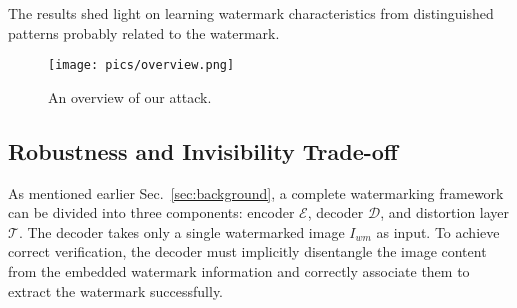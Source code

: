 The results shed light on learning watermark characteristics from distinguished patterns probably related to the watermark.

\begin{figure}[!t]
    \centering
    \texttt{[image: pics/overview.png]} 
    
    \caption{An overview of our attack.} 
    \label{fig:method-overview}
    \vspace{-3mm}
\end{figure}

\subsection{Robustness and Invisibility Trade-off}\label{sec:Method_Theory}
As mentioned earlier Sec.~\ref{sec:background}, a complete watermarking framework can be divided into three components: encoder $\mathcal{E}$, decoder $\mathcal{D}$, and distortion layer $\mathcal{T}$. The decoder takes only a single watermarked image $I_{wm}$ as input. To achieve correct verification, the decoder must implicitly disentangle the image content from the embedded watermark information and correctly associate them to extract the watermark successfully.




